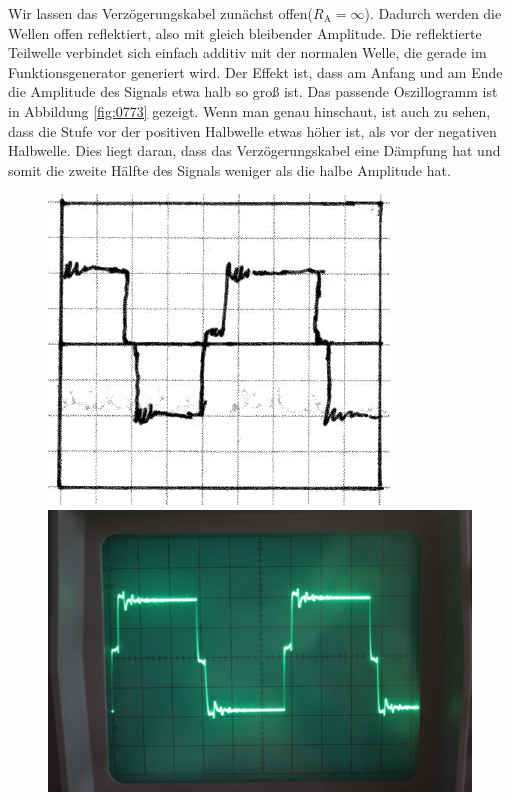 Wir lassen das Verzögerungskabel zunächst offen($R_\text{A}=\infty$). Dadurch
werden die Wellen offen reflektiert, also mit gleich bleibender Amplitude. Die
reflektierte Teilwelle verbindet sich einfach additiv mit der normalen Welle,
die gerade im Funktionsgenerator generiert wird. Der Effekt ist, dass am Anfang
und am Ende die Amplitude des Signals etwa halb so groß ist. Das passende
Oszillogramm ist in Abbildung \ref{fig:0773} gezeigt. Wenn man genau hinschaut,
ist auch zu sehen, dass die Stufe vor der positiven Halbwelle etwas höher
ist, als vor der negativen Halbwelle. Dies liegt daran, dass das
Verzögerungskabel eine Dämpfung hat und somit die zweite Hälfte des Signals
weniger als die halbe Amplitude hat.

\begin{figure}[htbp]
	\centering
	\begin{minipage}{.45\linewidth}
	\includegraphics[width=\linewidth]{Skizzen/IMG_0773-1500.jpg}
	\end{minipage}
	\hfill
	\begin{minipage}{.45\linewidth}
	\includegraphics[width=\linewidth]{Fotos/IMG_0773-1500.jpg}

\end{minipage}
\end{figure}
